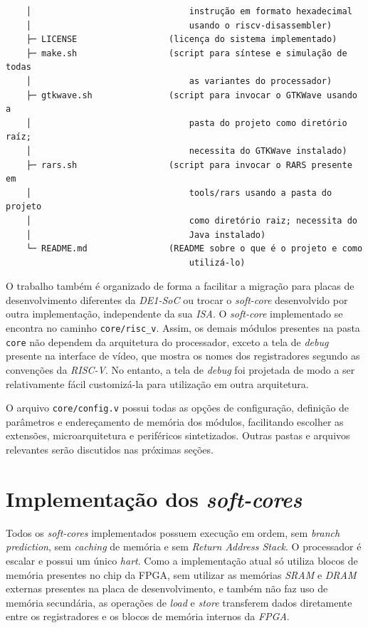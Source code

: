 \begin{verbatim}
    │                               instrução em formato hexadecimal
    │                               usando o riscv-disassembler)
    ├─ LICENSE                  (licença do sistema implementado)
    ├─ make.sh                  (script para síntese e simulação de todas
    │                               as variantes do processador)
    ├─ gtkwave.sh               (script para invocar o GTKWave usando a
    │                               pasta do projeto como diretório raíz;
    │                               necessita do GTKWave instalado)
    ├─ rars.sh                  (script para invocar o RARS presente em
    │                               tools/rars usando a pasta do projeto
    │                               como diretório raiz; necessita do
    │                               Java instalado)
    └─ README.md                (README sobre o que é o projeto e como
                                    utilizá-lo)
\end{verbatim}


    { O trabalho também é organizado de forma a facilitar a migração para placas de
        desenvolvimento diferentes da \textit{DE1-SoC} ou trocar o \textit{soft-core}
        desenvolvido por outra implementação, independente da sua \textit{ISA}.
        O \textit{soft-core} implementado se encontra no caminho
        \texttt{core/risc\_v}. Assim, os demais módulos presentes na pasta \texttt{core}
        não dependem da arquitetura do processador, exceto a tela de
        \textit{debug} presente na interface de vídeo, que mostra os nomes dos
        registradores segundo as convenções da \textit{RISC-V}. No entanto, a tela de
        \textit{debug} foi projetada de modo a ser relativamente fácil
        customizá-la para utilização em outra arquitetura.
    }

    {
        O arquivo \texttt{core/config.v} possui todas as opções de configuração,
        definição de parâmetros e endereçamento de memória dos módulos, facilitando
        escolher as extensões, microarquitetura e periféricos sintetizados. Outras
        pastas e arquivos relevantes serão discutidos nas próximas seções.
    }


\section{Implementação dos \textit{soft-cores}}
    { Todos os \textit{soft-cores} implementados possuem execução em ordem, sem
        \textit{branch prediction}, sem \textit{caching} de memória e sem
        \textit{Return Address Stack}. O processador é escalar e possui um
        único \textit{hart}. Como a implementação atual só utiliza blocos de
        memória presentes no chip da FPGA, sem utilizar as memórias
        \textit{SRAM} e \textit{DRAM} externas presentes na placa de
        desenvolvimento, e também não faz uso de memória secundária, as operações
        de \textit{load} e \textit{store} transferem dados diretamente entre os
        registradores e os blocos de memória internos da \textit{FPGA}.
    }


